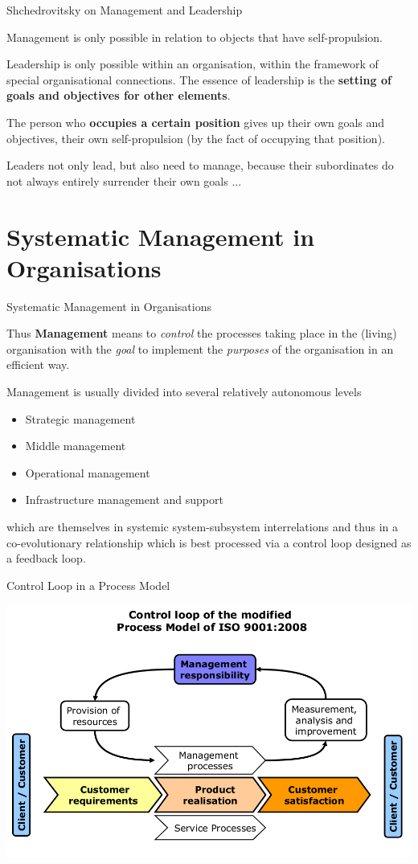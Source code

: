 \documentclass{beamer}
\begin{document}
\begin{frame}{Shchedrovitsky on Management and Leadership}

Management is only possible in relation to objects that have self-propulsion.

Leadership is only possible within an organisation, within the framework of
special organisational connections. The essence of leadership is the
\textbf{setting of goals and objectives for other elements}.

The person who \textbf{occupies a certain position} gives up their own goals
and objectives, their own self-propulsion (by the fact of occupying that
position).

Leaders not only lead, but also need to manage, because their subordinates do
not always entirely surrender their own goals ...
\end{frame}

\section{Systematic Management in Organisations}
\begin{frame}{Systematic Management in Organisations}

Thus \textbf{Management} means to \emph{control} the processes taking place in
the (living) organisation with the \emph{goal} to implement the
\emph{purposes} of the organisation in an efficient way.

Management is usually divided into several relatively autonomous levels
\begin{itemize}[noitemsep]
\item Strategic management
\item Middle management
\item Operational management
\item Infrastructure management and support
\end{itemize}
which are themselves in systemic system-subsystem interrelations and thus in a
co-evolutionary relationship which is best processed via a control loop
designed as a feedback loop.
\end{frame}

\begin{frame}{Control Loop in a Process Model}
\begin{center}
  \includegraphics[width=\textwidth]{2.png}
\end{center}
\end{frame}
\end{document}
